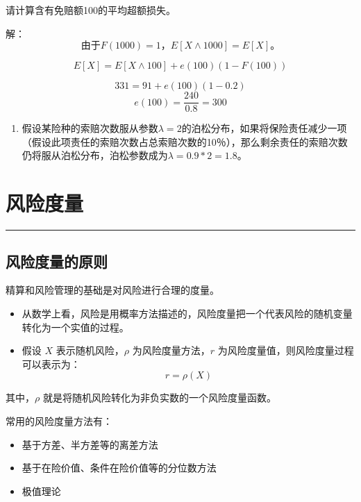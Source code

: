 \documentclass[
]{book}
\providecommand{\tightlist}{%
  \setlength{\itemsep}{0pt}\setlength{\parskip}{0pt}}
\begin{document}
请计算含有免赔额100的平均超额损失。

解：
\[由于F(1000) = 1，E[X \wedge 1000] = E[X]。\]

\[E[X] = E[X \wedge 100 ] + e(100)(1 - F(100))\]

\[331 = 91 + e(100)(1 - 0.2)\]
\[e(100)=\frac{240}{0.8}=300\]

\begin{enumerate}
\def\labelenumi{\arabic{enumi}.}
\setcounter{enumi}{2}
\tightlist
\item
  假设某险种的索赔次数服从参数\(\lambda=2\)的泊松分布，如果将保险责任减少一项（假设此项责任的索赔次数占总索赔次数的10％），那么剩余责任的索赔次数仍将服从泊松分布，泊松参数成为\(\lambda=0.9*2=1.8\)。
\end{enumerate}

\hypertarget{riskmea}{%
\chapter{风险度量}\label{riskmea}}

\begin{center}\rule{0.5\linewidth}{0.5pt}\end{center}

\hypertarget{ux98ceux9669ux5ea6ux91cfux7684ux539fux5219}{%
\section{风险度量的原则}\label{ux98ceux9669ux5ea6ux91cfux7684ux539fux5219}}

精算和风险管理的基础是对风险进行合理的度量。

\begin{itemize}
\item
  从数学上看，风险是用概率方法描述的，风险度量把一个代表风险的随机变量转化为一个实值的过程。
\item
  假设 \(X\) 表示随机风险，\(\rho\) 为风险度量方法，\(r\) 为风险度量值，则风险度量过程可以表示为： \[r = \rho(X)\]
\end{itemize}

其中，\(\rho\) 就是将随机风险转化为非负实数的一个风险度量函数。

常用的风险度量方法有：

\begin{itemize}
\item
  基于方差、半方差等的离差方法
\item
  基于在险价值、条件在险价值等的分位数方法
\item
  极值理论
\end{itemize}
\end{document}
